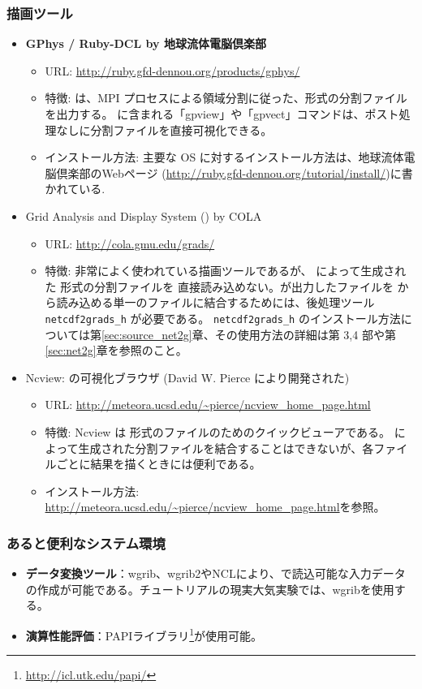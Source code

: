 \subsubsection{\bf 描画ツール}
\begin{itemize}
  \item {\bf GPhys / Ruby-DCL by 地球流体電脳倶楽部}
  \begin{itemize}
    \item URL: \url{http://ruby.gfd-dennou.org/products/gphys/}
    \item 特徴: \scalelib は、MPI プロセスによる領域分割に従った、{\netcdf}形式の分割ファイルを出力する。
{\gphys}に含まれる「gpview」や「gpvect」コマンドは、ポスト処理なしに分割ファイルを直接可視化できる。
    \item インストール方法: 主要な OS に対するインストール方法は、地球流体電脳倶楽部のWebページ
    (\url{http://ruby.gfd-dennou.org/tutorial/install/})に書かれている. 
  \end{itemize}
  \item Grid Analysis and Display System ({\grads}) by COLA
  \begin{itemize}
    \item URL: \url{http://cola.gmu.edu/grads/}
    \item 特徴: 非常によく使われている描画ツールであるが、 \scalelib によって生成された {\netcdf}形式の分割ファイルを 
    直接読み込めない。\scalelib が出力したファイルを {\grads} から読み込める単一のファイルに結合するためには、後処理ツール \verb|netcdf2grads_h| が必要である。
    \verb|netcdf2grads_h| のインストール方法については第\ref{sec:source_net2g}章、その使用方法の詳細は第 3,4 部や第\ref{sec:net2g}章を参照のこと。
 \end{itemize}
 \item Ncview: {\netcdf} の可視化ブラウザ (David W. Pierce により開発された)
  \begin{itemize}
  \item URL: \url{http://meteora.ucsd.edu/~pierce/ncview_home_page.html}
  \item 特徴: Ncview は {\netcdf}形式のファイルのためのクイックビューアである。
  \scalelib によって生成された分割ファイルを結合することはできないが、各ファイルごとに結果を描くときには便利である。
  \item インストール方法: \url{http://meteora.ucsd.edu/~pierce/ncview_home_page.html}を参照。
 \end{itemize}
\end{itemize}

\subsubsection{\bf あると便利なシステム環境}
\begin{itemize}
  \item {\bf データ変換ツール}：wgrib、wgrib2やNCLにより、\scalerm で読込可能な入力データの作成が可能である。チュートリアルの現実大気実験では、wgribを使用する。
  \item {\bf 演算性能評価}：PAPIライブラリ\footnote{\url{http://icl.utk.edu/papi/}}が使用可能。
\end{itemize}

